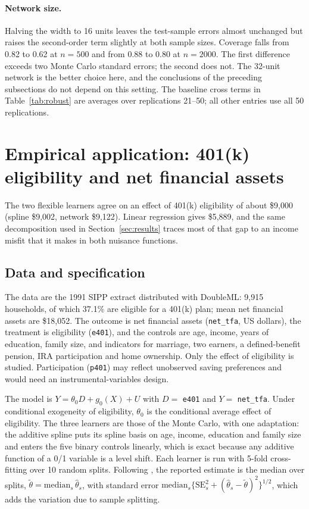 \documentclass[11pt,a4paper]{article}
\newcommand{\code}[1]{\texttt{#1}}
\begin{document}
\paragraph{Network size.} Halving the width to 16 units leaves the test-sample errors almost unchanged but raises the second-order term slightly at both sample sizes. Coverage falls from 0.82 to 0.62 at $n=500$ and from 0.88 to 0.80 at $n=2000$. The first difference exceeds two Monte Carlo standard errors; the second does not. The 32-unit network is the better choice here, and the conclusions of the preceding subsections do not depend on this setting. The baseline cross terms in Table~\ref{tab:robust} are averages over replications 21--50; all other entries use all 50 replications.

\section{Empirical application: 401(k) eligibility and net financial assets}\label{sec:app}

The two flexible learners agree on an effect of 401(k) eligibility of about \$9,000 (spline \$9,002, network \$9,122). Linear regression gives \$5,889, and the same decomposition used in Section~\ref{sec:results} traces most of that gap to an income misfit that it makes in both nuisance functions.

\subsection{Data and specification}

The data are the 1991 SIPP extract distributed with DoubleML: 9,915 households, of which 37.1\% are eligible for a 401(k) plan; mean net financial assets are \$18,052. The outcome is net financial assets (\code{net\_tfa}, US dollars), the treatment is eligibility (\code{e401}), and the controls are age, income, years of education, family size, and indicators for marriage, two earners, a defined-benefit pension, IRA participation and home ownership. Only the effect of eligibility is studied. Participation (\code{p401}) may reflect unobserved saving preferences and would need an instrumental-variables design.

The model is $Y=\theta_0D+g_0(X)+U$ with $D=$ \code{e401} and $Y=$ \code{net\_tfa}. Under conditional exogeneity of eligibility, $\theta_0$ is the conditional average effect of eligibility. The three learners are those of the Monte Carlo, with one adaptation: the additive spline puts its spline basis on age, income, education and family size and enters the five binary controls linearly, which is exact because any additive function of a 0/1 variable is a level shift. Each learner is run with 5-fold cross-fitting over 10 random splits. Following \citet{chernozhukov2018}, the reported estimate is the median over splits, $\tilde\theta=\mathrm{median}_s\,\hat\theta_s$, with standard error $\mathrm{median}_s\{\mathrm{SE}_s^2+(\hat\theta_s-\tilde\theta)^2\}^{1/2}$, which adds the variation due to sample splitting.
\end{document}

